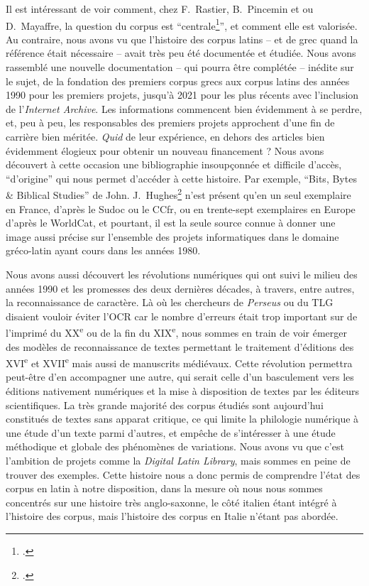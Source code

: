Il est intéressant de voir comment, chez F.~Rastier, B.~Pincemin et ou D.~Mayaffre, la question du corpus est \enquote{centrale\footcite[p.~59]{mayaffre2008occurrence}}, et comment elle est valorisée. Au contraire, nous avons vu que l'histoire des corpus latins -- et de grec quand la référence était nécessaire -- avait très peu été documentée et étudiée. Nous avons rassemblé une nouvelle documentation -- qui pourra être complétée -- inédite sur le sujet, de la fondation des premiers corpus grecs aux corpus latins des années 1990 pour les premiers projets, jusqu'à 2021 pour les plus récents avec l'inclusion de l'\textit{Internet Archive}. Les informations commencent bien évidemment à se perdre, et, peu à peu, les responsables des premiers projets approchent d'une fin de carrière bien méritée. \textit{Quid} de leur expérience, en dehors des articles bien évidemment élogieux pour obtenir un nouveau financement ? Nous avons découvert à cette occasion une bibliographie insoupçonnée et difficile d'accès, \enquote{d'origine} qui nous permet d'accéder à cette histoire. Par exemple, \enquote{Bits, Bytes \& Biblical Studies} de John. J.~Hughes\footcite{hughes_bits_1987} n'est présent qu'en un seul exemplaire en France, d'après le Sudoc ou le CCfr, ou en trente-sept exemplaires en Europe d'après le WorldCat, et pourtant, il est la seule source connue à donner une image aussi précise sur l'ensemble des projets informatiques dans le domaine gréco-latin ayant cours dans les années 1980.

Nous avons aussi découvert les révolutions numériques qui ont suivi le milieu des années 1990 et les promesses des deux dernières décades, à travers, entre autres, la reconnaissance de caractère. Là où les chercheurs de \textit{Perseus} ou du TLG disaient vouloir éviter l'OCR car le nombre d'erreurs était trop important sur de l'imprimé du XX\textsuperscript{e} ou de la fin du XIX\textsuperscript{e}, nous sommes en train de voir émerger des modèles de reconnaissance de textes permettant le traitement d'éditions des XVI\textsuperscript{e} et XVII\textsuperscript{e} mais aussi de manuscrits médiévaux. Cette révolution permettra peut-être d'en accompagner une autre, qui serait celle d'un basculement vers les éditions nativement numériques et la mise à disposition de textes par les éditeurs scientifiques. La très grande majorité des corpus étudiés sont aujourd'hui constitués de textes sans apparat critique, ce qui limite la philologie numérique à une étude d'un texte parmi d'autres, et empêche de s'intéresser à une étude méthodique et globale des phénomènes de variations. Nous avons vu que c'est l'ambition de projets comme la \textit{Digital Latin Library}, mais sommes en peine de trouver des exemples. Cette histoire nous a donc permis de comprendre l'état des corpus en latin à notre disposition, dans la mesure où nous nous sommes concentrés sur une histoire très anglo-saxonne, le côté italien étant intégré à l'histoire des corpus, mais l'histoire des corpus en Italie n'étant pas abordée.


